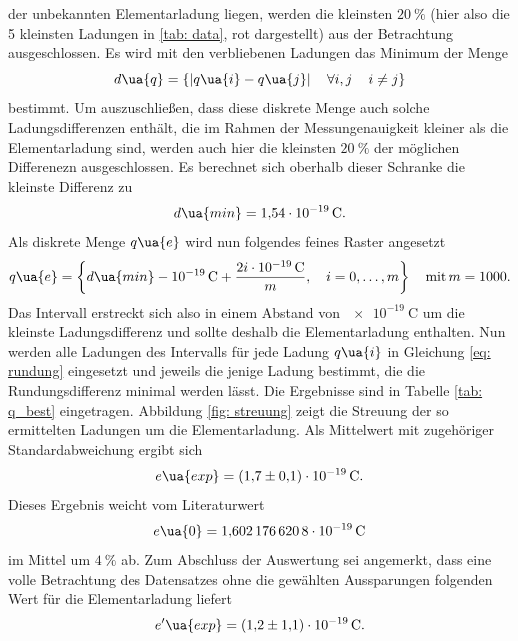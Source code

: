 der unbekannten Elementarladung liegen, werden die kleinsten $\SI{20}{\percent}$ (hier also die 5 kleinsten Ladungen in \ref{tab: data}, rot dargestellt)
aus der Betrachtung ausgeschlossen. Es wird mit den verbliebenen Ladungen das Minimum der Menge
\begin{equation}
  d\ua{q} = \left\{ \left| q\ua{i} - q\ua{j}\right| \quad \forall  i, j \, \quad i \neq j   \right\}
\end{equation}
bestimmt. Um auszuschließen, dass diese diskrete Menge auch solche Ladungsdifferenzen enthält, die im Rahmen der Messungenauigkeit
kleiner als die Elementarladung sind, werden auch hier die kleinsten $\SI{20}{\percent}$ der möglichen Differenezn ausgeschlossen.
Es berechnet sich oberhalb dieser Schranke die kleinste Differenz zu
\begin{equation}
  d\ua{min} = \SI{1.54e-19}{\coulomb}.
\end{equation}
Als diskrete Menge $q\ua{e}$ wird nun folgendes feines Raster angesetzt
\begin{equation}
  q\ua{e} = \left\{ d\ua{min} - \SI{e-19}{\coulomb}  +  \frac{2i \cdot \SI{e-19}{\coulomb}}{m}, \quad i = 0, \dots, m     \right\}\quad \text{mit} \, m = 1000.
\end{equation}
Das Intervall erstreckt sich also in einem Abstand von $\SI{e-19}{\coulomb}$ um die kleinste Ladungsdifferenz und sollte deshalb die Elementarladung enthalten.
Nun werden alle Ladungen des Intervalls für jede Ladung $q\ua{i}$ in Gleichung \eqref{eq: rundung} eingesetzt und jeweils die jenige Ladung bestimmt,
die die Rundungsdifferenz minimal werden lässt. Die Ergebnisse sind in Tabelle \ref{tab: q_best} eingetragen. Abbildung \ref{fig: streuung} zeigt die Streuung
der so ermittelten Ladungen um die Elementarladung. Als Mittelwert mit zugehöriger Standardabweichung ergibt sich
\begin{equation}
  e\ua{exp} = \SI{+1.7(1)e-19}{\coulomb}.
\end{equation}
Dieses Ergebnis weicht vom Literaturwert
\begin{equation}
  e\ua{0} = \SI{1.6021766208e-19}{\coulomb}
\end{equation}
im Mittel um $\SI{4}{\percent}$ ab. Zum Abschluss der Auswertung sei angemerkt, dass eine volle Betrachtung des Datensatzes ohne
die gewählten Aussparungen folgenden Wert für die Elementarladung liefert
\begin{equation}
   e'\ua{exp} = \SI{+1.2(11)e-19}{\coulomb}.
\end{equation}

